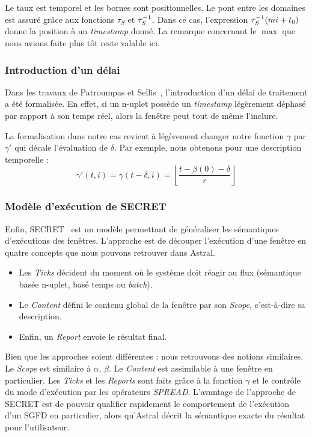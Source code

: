 Le taux est temporel et les bornes sont positionnelles. Le pont entre les domaines est assuré grâce aux fonctions $\tau_S$ et $\tau^{-1}_S$. Dans ce cas, l'expression $\tau^{-1}_S(mi+t_0)$ donne la position à un \textit{timestamp} donné. La remarque concernant le $\max$ que nous avions faite plus tôt reste valable ici.

\subsubsection{Introduction d'un délai}
Dans les travaux de Patroumpas et Sellis~\cite{Patroumpas:window}, l'introduction d'un délai de traitement a été formalisée. En effet, si un n-uplet possède un \textit{timestamp} légèrement déphasé par rapport à son temps réel, alors la fenêtre peut tout de même l'inclure.

La formalisation dans notre cas revient à légèrement changer notre fonction $\gamma$ par $\gamma'$ qui décale l'évaluation de $\delta$. Par exemple, nous obtenons pour une description temporelle : $$\gamma'(t,i) = \gamma(t-\delta,i) = \left\lfloor\frac{t-\beta(0)-\delta}{r}\right\rfloor$$

\subsubsection{Modèle d'exécution de SECRET}
Enfin, SECRET~\cite{Botan:secret} est un modèle permettant de généraliser les sémantiques d'exécutions des fenêtres. L'approche est de découper l'exécution d'une fenêtre en quatre concepts que nous pouvons retrouver dans Astral.
\begin{itemize}
	\item Les \textit{Ticks} décident du moment où le système doit réagir au flux (sémantique basée n-uplet, basé temps ou \textit{batch}).
	\item Le \textit{Content} défini le contenu global de la fenêtre par son \textit{Scope}, c'est-à-dire sa description.
	\item Enfin, un \textit{Report} envoie le résultat final.
\end{itemize}

Bien que les approches soient différentes : nous retrouvons des notions similaires. Le \textit{Scope} est similaire à $\alpha$, $\beta$. Le \textit{Content} est assimilable à une fenêtre en particulier. Les \textit{Ticks} et les \textit{Reports} sont faits grâce à la fonction $\gamma$ et le contrôle du mode d'exécution par les opérateurs \textit{SPREAD}. L'avantage de l'approche de SECRET est de pouvoir qualifier rapidement le comportement de l'exécution d'un SGFD en particulier, alors qu'Astral décrit la sémantique exacte du résultat pour l'utilisateur.

